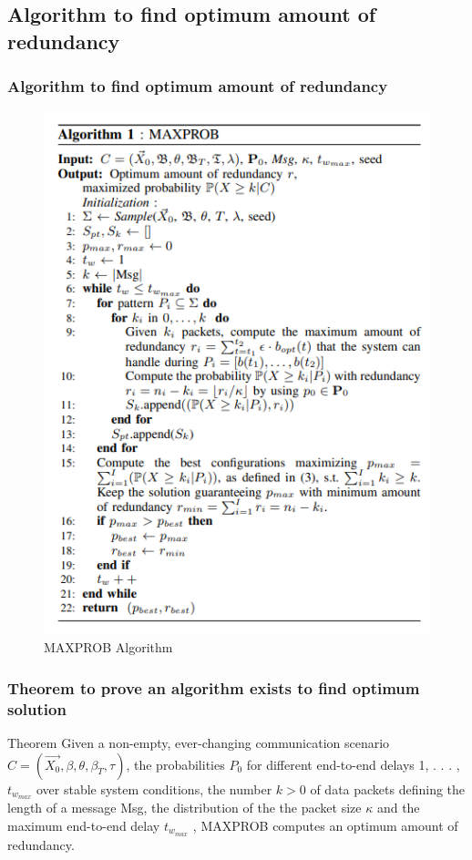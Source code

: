 \documentclass{beamer}
\begin{document}
\subsection{Algorithm to find optimum amount of redundancy}
\begin{frame}[fragile]
\frametitle{Algorithm to find optimum amount of redundancy}
\begin{figure}
    \includegraphics[scale=0.55]{research-paper-image -2.PNG}
    \caption{MAXPROB Algorithm}
\end{figure}
\end{frame}
\begin{frame}[fragile]
\frametitle{Theorem to prove an algorithm exists to find optimum solution}
\begin{block}{Theorem}
Given a non-empty, ever-changing communication scenario $C= (\overrightarrow{X_0},\beta,\theta,\beta_T,\tau)$, the probabilities $P_0$ for different end-to-end delays 1, . . . , $t_{w_{max}}$ over stable system conditions, the number $k > 0$ of data packets defining the length of a message Msg, the distribution of the the packet size $\kappa$ and the maximum end-to-end delay $t_{w_{max}}$ , MAXPROB computes an optimum amount of redundancy.
\end{block}
\end{frame}
\end{document}
